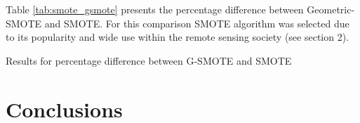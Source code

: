 \documentclass[parskip=full]{scrartcl}
\begin{document}
Table \ref{tab:smote_gsmote} presents the percentage difference  between 
Geometric-SMOTE and SMOTE. For this comparison SMOTE algorithm was selected due 
to its popularity and wide use within the remote sensing society (see section 
2).

\begin{table}[H]
	\centering
	\caption{\label{tab:smote_gsmote}Results for percentage difference between 
		G-SMOTE and SMOTE}
\end{table}

\section{Conclusions}





\end{document}
